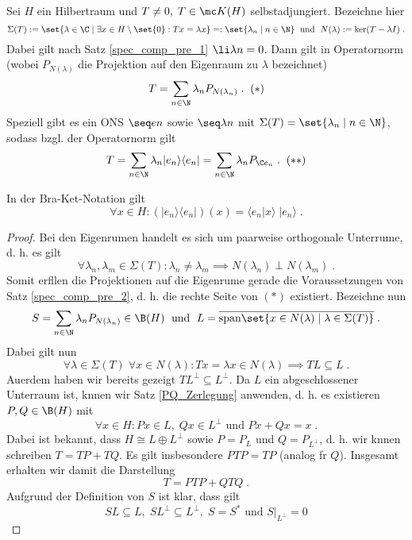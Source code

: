 \begin{theorem}
	\label{spec_comp}
	Sei $H$ ein Hilbertraum und \(T\neq 0, \; T\in \mc K(H)\) selbstadjungiert. Bezeichne hier  \[\Sigma(T) := \set{\lambda \in \C \;\vert\; \exists x \in H\setminus \set{0}: Tx = \lambda x} =: \set{\lambda_n\;\vert\; n\in\N} \;\text{ und }\; N(\lambda) := \ker(T - \lambda I)\;.\]
	Dabei gilt nach Satz \ref{spec_comp_pre_1} \(\li \lambda n = 0\).
	Dann gilt in Operatornorm (wobei \(P_{N(\lambda)}\) die Projektion auf den Eigenraum zu $\lambda$ bezeichnet)
	\[T = \sum_{n\in\N} \lambda_n P_{N(\lambda_n)}\;.\;\;(*)\]
	Speziell gibt es ein ONS \(\seq en\) sowie \(\seq \lambda n\) mit \(\Sigma(T) = \set{\lambda_n\;\vert\;n\in\N}\), sodass bzgl. der Operatornorm gilt
	\[T = \sum_{n\in\N} \lambda_n \vert e_n \rangle \langle e_n\vert = \sum_{n\in\N} \lambda_n P_{\C e_n}\;.\;\;(**)\]
	\begin{rem}
		In der Bra-Ket-Notation gilt
		\[\forall x \in H : (\vert e_n \rangle \langle e_n\vert)(x) =  \langle e_n \vert x \rangle \;\vert e_n \rangle\;.\]
	\end{rem}
	\begin{proof}
		Bei den Eigenr\as umen handelt es sich um paarweise orthogonale Unterr\as ume, d. h. es gilt 
		\[\forall \lambda_n, \lambda_m \in \Sigma(T): \lambda_n \neq \lambda_m \implies N(\lambda_n) \perp N(\lambda_m)\;.\]
		Somit erf\us llen die Projektionen auf die Eigenr\as ume gerade die Voraussetzungen von Satz \ref{spec_comp_pre_2}, d. h. die rechte Seite von \((*)\) existiert.  Bezeichne nun 
		\[S = \sum_{n\in\N} \lambda_n P_{N(\lambda_n)} \in \B(H)\;\text{ und } \; L = \overline{\text{span}\set{x \in N(\lambda)\;\vert\; \lambda \in \Sigma(T)}}\;.\]
		Dabei gilt nun 
		\[\forall \lambda \in \Sigma(T) \;\forall x\in N(\lambda): Tx = \lambda x \in N(\lambda) \implies TL \subseteq L\;.\]
		Au\s erdem haben wir bereits gezeigt \(TL^\perp \subseteq L^\perp\).
		Da $L$ ein abgeschlossener Unterraum ist, k\os nnen wir Satz \ref{PQ_Zerlegung} anwenden, d. h. es existieren \(P, Q \in \B(H)\) mit 
		\[\forall x \in H: Px \in L,\; Qx \in L^\perp \text{ und } Px + Qx = x \;.\]
		Dabei ist bekannt, dass \(H\cong L \oplus L^\perp\) sowie \(P = P_L\) und \(Q = P_{L^\perp}\), d. h. wir k\os nnen schreiben \(T = TP + TQ\). Es gilt insbesondere $PTP = TP$ (analog f\us r $Q$). Insgesamt erhalten wir damit die Darstellung
		\[ T = PTP + QTQ\;.\]
		Aufgrund der Definition von $S$ ist klar, dass gilt
		\[SL \subseteq L,\; SL^\perp \subseteq L^\perp, \; S = S^* \text{ und }  S\vert_{L^\perp} = 0\]

\end{proof}
\end{theorem}
